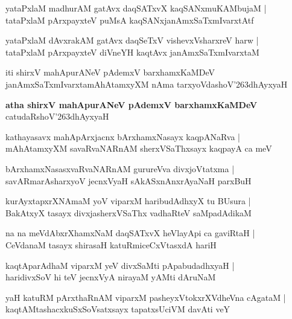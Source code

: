 \begin{shloka}
yataPxlaM madhurAM gatAvx daqSATxvX kaqSANxmuKAMbujaM |\\
tataPxlaM pArxpayxteV puMsA kaqSANxjanAmxSaTxmIvarxtAtf
\end{shloka}

\begin{shloka}
yataPxlaM dAvxrakAM gatAvx daqSeTxV vishevxVsharxreV harw |\\
tataPxlaM pArxpayxteV diVneYH kaqtAvx janAmxSaTxmIvarxtaM
\end{shloka}
iti shirxV mahApurANeV pAdemxV barxhamxKaMDeV janAmxSaTxmIvarxtamAhAtamxyXM nAma tarxyoVdashoV\char'263dhAyxyaH

\begin{center}
\textbf{\large atha shirxV mahApurANeV pAdemxV barxhamxKaMDeV}\\
catudaRshoV\char'263dhAyxyaH
\end{center}

\setcounter{shloka}{0}
\begin{shloka}
kathayasavx mahApArxjacnx bArxhamxNasayx kaqpANaRva |\\
mAhAtamxyXM savaRvaNARnAM sherxVSaThxsayx kaqpayA ca meV 
\end{shloka}

\begin{shloka}
bArxhamxNasasxvaRvaNARnAM gurureVva divxjoVtatxma |\\
savARmarAsharxyoV jecnxVyaH sAkASxnAnxrAyaNaH parxBuH
\end{shloka}

\begin{shloka}
kurAyxtapxrXNAmaM yoV viparxM haribudAdhxyX tu BUsura |\\
BakAtxyX tasayx divxjasherxVSaThx vadhaRteV saMpadAdikaM
\end{shloka}

\begin{shloka}
na na meVdAbxrXhamxNaM daqSATxvX heVlayApi ca gaviRtaH |\\
CeVdanaM tasayx shirasaH katuRmiceCxVtasxdA hariH 
\end{shloka}

\begin{shloka}
kaqtAparAdhaM viparxM yeV divxSaMti pApabudadhxyaH |\\
haridivxSoV hi teV jecnxVyA nirayaM yAMti dAruNaM 
\end{shloka}

\begin{shloka}
yaH katuRM pArxthaRnAM viparxM pasheyxVtokxrXVdheVna cAgataM |\\
kaqtAMtashacxkuSxSoVsatxsayx tapatxsUciVM davAti veY
\end{shloka}

